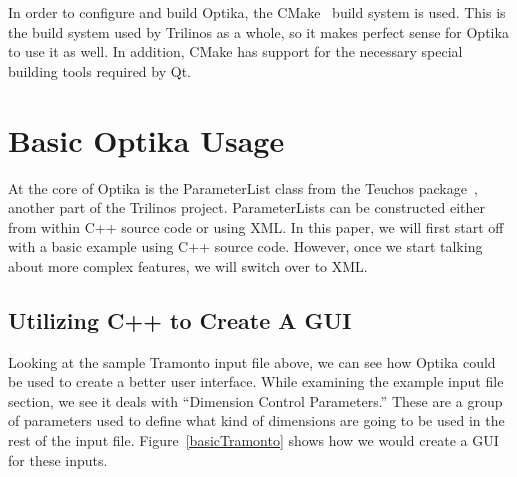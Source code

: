 In order to configure and build Optika, the CMake~\cite{cmake} build system is used. This is the build system
used by Trilinos as a whole, so it makes perfect sense for Optika to use it as well. In addition, CMake
has support for the necessary special building tools required by Qt.

\section{Basic Optika Usage}
At the core of Optika is the ParameterList class from the Teuchos package~\cite{TeuchosPackage}, another part
of the Trilinos project. ParameterLists can be constructed either from within C++ source code or using XML.
In this paper, we will first start off with a basic example using C++ source code. However, once we start
talking about more complex features, we will switch over to XML.
\subsection{Utilizing C++ to Create A GUI}
Looking at the sample Tramonto input file above, we can see how Optika could be used to create a better user interface.
While examining the example input file section, we see it deals with ``Dimension Control Parameters.'' These are a group of parameters 
used to define what kind of dimensions are going to be used in the rest of the input file. Figure~\ref{basicTramonto} shows how we would create
a GUI for these inputs.

